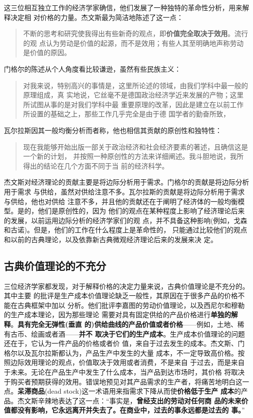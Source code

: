 这三位相互独立工作的经济学家确信，他们发展了一种独特的革命性分析，用来解释决定相
对价格的力量。杰文斯最为简洁地陈述了这一点：
\begin{quotation}
  不断的思考和研究使我得出有些新奇的观点，即\textbf{价值完全取决于效用}。流行的观
  点认为劳动是价值的起源，而不是效用；有些人其至明确地声称劳动是价值的原因。
\end{quotation}

门格尔的陈述从个人角度看比较谦逊，虽然有些民族主义：
\begin{quotation}
  对我来说，特别高兴的事情是，这里所论述的领域，由我们学科中最一般的原理组成，真
  实地说，它丝毫不是德国政治经济学近来发展的产物；这里所试图从事的是对我们学科中最
  重要原理的改革，因此是建立在以前工作所设置的基础之上，那些工作几乎完全是由于德
  国学者的勤奋所致，
\end{quotation}

瓦尔拉斯因其一般均衡分析而者称，他也相信其贡献的原创性和独特性：
\begin{quotation}
  现在我能够开始出版一部关于政治经济和社会经济要素的著述，且确信这是一个新的计划，
  并按照一种原创性的方法来详细阐述。我斗胆地说，我所得出的结论在几个方面不同于当
  前的经济科学。
\end{quotation}

杰文斯对经济理论的贡献主要是将边际分析用于需求。门格尔的贡献是将边际分析用于需求
与供给，虽然对供给注意不多。瓦尔拉斯的贡献是将边际分析用于需求与供给，他也对供给
注意不多，并且他的贡献还在于阐明了经济体的一般均衡模型。是的，他们是原创性的，因为
他们的观点在某种程度上影响了经济理论后来的发展，以前运用边际分析的经济学家们的观
点，并不具备这种影响(例如，戈森和古诺)。但是，他们的工作在什么程度上是革命性的，
只能通过比较他们的观点和以前的古典理论，以及依靠新古典微观经济理论后来的发展来决
定。

\subsection{古典价值理论的不充分}

三位经济学家都发现，对于解释价格的决定力量来说，古典价值理论是不充分的。其中主要
的批评是生产成本价值理论缺乏一般性，其原因在于很多产品的价格不能在古典框架中加以
分析。他们批评李嘉图的劳动价值理论，以及西尼尔和穆勒的生产成本理论，因为那些理论
需要对具有固定供给的产品价格进行\textbf{单独的解释}。\textbf{具有完全无弹性(垂直
  的)供给曲线的产品价值或者价格}——例如，土地、稀有古币、绘画或者酒——\textbf{并不
  取决于它们的生产成本}。生产成本价值理论的问题还在于，它认为一件产品的价格或者价
值，来自于过去发生的成本。杰文斯、门格尔以及瓦尔拉斯都认为，产品生产中发生的大量
成本，不一定导致高价格。按照边际效用理论的观点，价值取决于效用或者消费，不是来自
于过去，而是来自于未来。无论在产品生产中发生了什么成本，当产品到达市场时，其价格
将取决于购买者预期获得的效用。错误地预见对其产品需求的生产者，将痛苦地明白这一
点。\textbf{呆滞商品}(dead stock)这一术语用来指需求下降从而使\textbf{价格低于生产
  成本}的产品。杰文斯辛辣地表达了这一点：“事实是，\textbf{曾经支出的劳动对任何商
  品的未来价值都没有影响，它永远离开并失去了。在商业中，过去的事永远都是过去的
  事。}”

